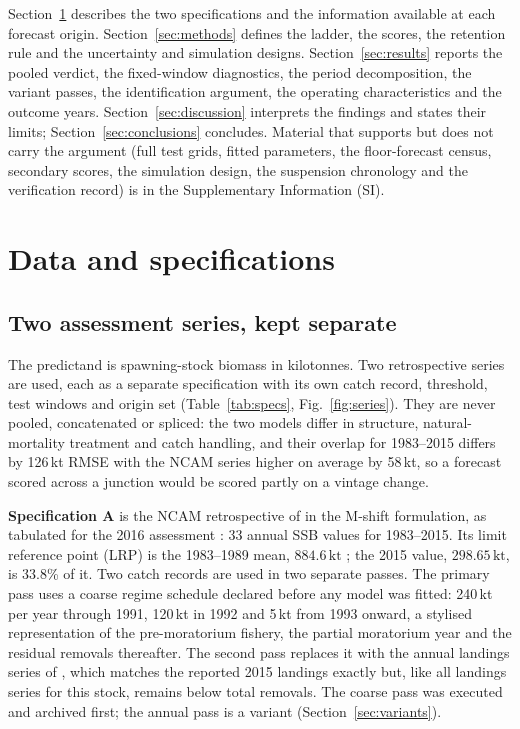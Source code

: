 \documentclass[preprint,11pt,authoryear]{elsarticle}
\theoremstyle{definition}
\theoremstyle{remark}
\newcommand{\kt}{\,\mathrm{kt}}
\begin{document}
Section~\ref{sec:data} describes the two specifications and the information available at each forecast origin. Section~\ref{sec:methods} defines the ladder, the scores, the retention rule and the uncertainty and simulation designs. Section~\ref{sec:results} reports the pooled verdict, the fixed-window diagnostics, the period decomposition, the variant passes, the identification argument, the operating characteristics and the outcome years. Section~\ref{sec:discussion} interprets the findings and states their limits; Section~\ref{sec:conclusions} concludes. Material that supports but does not carry the argument (full test grids, fitted parameters, the floor-forecast census, secondary scores, the simulation design, the suspension chronology and the verification record) is in the Supplementary Information (SI).
\section{Data and specifications}\label{sec:data}

\subsection{Two assessment series, kept separate}\label{sec:specs}

The predictand is spawning-stock biomass in kilotonnes. Two retrospective series are used, each as a separate specification with its own catch record, threshold, test windows and origin set (Table~\ref{tab:specs}, Fig.~\ref{fig:series}). They are never pooled, concatenated or spliced: the two models differ in structure, natural-mortality treatment and catch handling, and their overlap for 1983--2015 differs by 126\,kt RMSE with the NCAM series higher on average by 58\,kt, so a forecast scored across a junction would be scored partly on a vintage change.

\textbf{Specification A} is the NCAM retrospective of \citet{Cadigan2016} in the M-shift formulation, as tabulated for the 2016 assessment \citep[Table A2]{DFO2016}: 33 annual SSB values for 1983--2015. Its limit reference point (LRP) is the 1983--1989 mean, $884.6\kt$ \citep{DFO2009,DFO2016}; the 2015 value, $298.65\kt$, is 33.8\% of it. Two catch records are used in two separate passes. The primary pass uses a coarse regime schedule declared before any model was fitted: 240\,kt per year through 1991, 120\,kt in 1992 and 5\,kt from 1993 onward, a stylised representation of the pre-moratorium fishery, the partial moratorium year and the residual removals thereafter. The second pass replaces it with the annual landings series of \citet{Schijns2021}, which matches the reported 2015 landings exactly but, like all landings series for this stock, remains below total removals. The coarse pass was executed and archived first; the annual pass is a variant (Section~\ref{sec:variants}).
\end{document}
